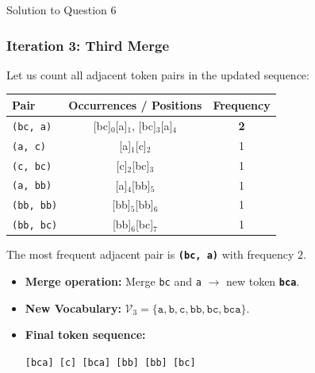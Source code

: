\documentclass[11pt,a4paper]{article}
\begin{document}
\begin{solutionbox}{Solution to Question 6}
\subsubsection*{Iteration 3: Third Merge}
Let us count all adjacent token pairs in the updated sequence:
\begin{center}
\begin{tabular}{lcc}
\toprule
\textbf{Pair} & \textbf{Occurrences / Positions} & \textbf{Frequency} \\
\midrule
\texttt{(bc, a)} & [bc]$_0$[a]$_1$, [bc]$_3$[a]$_4$ & \textbf{2} \\
\texttt{(a, c)} & [a]$_1$[c]$_2$ & 1 \\
\texttt{(c, bc)} & [c]$_2$[bc]$_3$ & 1 \\
\texttt{(a, bb)} & [a]$_4$[bb]$_5$ & 1 \\
\texttt{(bb, bb)} & [bb]$_5$[bb]$_6$ & 1 \\
\texttt{(bb, bc)} & [bb]$_6$[bc]$_7$ & 1 \\
\bottomrule
\end{tabular}
\end{center}
The most frequent adjacent pair is \texttt{\textbf{(bc, a)}} with frequency $2$.
\begin{itemize}
    \item \textbf{Merge operation:} Merge \texttt{bc} and \texttt{a} $\longrightarrow$ new token \texttt{\textbf{bca}}.
    \item \textbf{New Vocabulary:} $\mathcal{V}_3 = \{\texttt{a}, \texttt{b}, \texttt{c}, \texttt{bb}, \texttt{bc}, \texttt{bca}\}$.
    \item \textbf{Final token sequence:}
    \begin{center}
    \texttt{[bca] [c] [bca] [bb] [bb] [bc]}
    \end{center}
\end{itemize}
\end{solutionbox}

\bigskip
\end{document}
